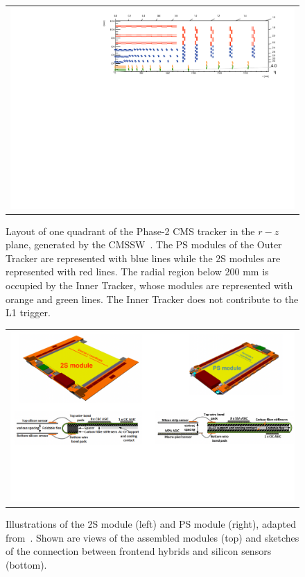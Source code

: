 \begin{figure}[tbh!]
 \begin{center}
  \begin{tabular}{c}
   \centering\includegraphics[width=0.9\linewidth]{figures/Part2/Upgrade/TrackerGeo}
  \end{tabular}
  \caption{Layout of one quadrant of the Phase-2 \ac{CMS} tracker in the $r-z$ plane, generated by the \ac{CMSSW}~\cite{cmssw}. The PS modules of the Outer Tracker are represented with blue lines while the 2S modules are represented with red lines. The radial region below 200 mm is occupied by the Inner Tracker, whose modules are represented with orange and green lines. The Inner Tracker does not contribute to the \ac{L1} trigger.}
 \label{fig:TrackerGeo}
 \end{center}
\end{figure}

\begin{figure}[tbh!]
 \begin{center}
  \begin{tabular}{c}
   \centering\includegraphics[width=0.95\linewidth]{figures/Part2/Upgrade/Modules}
  \end{tabular}
  \caption{Illustrations of the 2S module (left) and PS module (right), adapted from~\cite{CMS:2017lum}. Shown are views of the assembled modules (top) and sketches of the connection between frontend hybrids and silicon sensors (bottom).}
 \label{fig:Modules}
 \end{center}
\end{figure}


